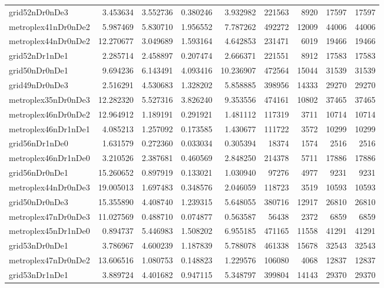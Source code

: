 \begin{longtable}{|l|r|r|r|r|r|r|r|r|}
grid52nDr0nDe3 & 3.453634 & 3.552736 & 0.380246 & 3.932982 & 221563 & 8920 & 17597 & 17597 \\
metroplex41nDr0nDe2 & 5.987469 & 5.830710 & 1.956552 & 7.787262 & 492272 & 12009 & 44006 & 44006 \\
metroplex44nDr0nDe2 & 12.270677 & 3.049689 & 1.593164 & 4.642853 & 231471 & 6019 & 19466 & 19466 \\
grid52nDr1nDe1 & 2.285714 & 2.458897 & 0.207474 & 2.666371 & 221551 & 8912 & 17583 & 17583 \\
grid50nDr0nDe1 & 9.694236 & 6.143491 & 4.093416 & 10.236907 & 472564 & 15044 & 31539 & 31539 \\
grid49nDr0nDe3 & 2.516291 & 4.530683 & 1.328202 & 5.858885 & 398956 & 14333 & 29270 & 29270 \\
metroplex35nDr0nDe3 & 12.282320 & 5.527316 & 3.826240 & 9.353556 & 474161 & 10802 & 37465 & 37465 \\
metroplex46nDr0nDe2 & 12.964912 & 1.189191 & 0.291921 & 1.481112 & 117319 & 3711 & 10714 & 10714 \\
metroplex46nDr1nDe1 & 4.085213 & 1.257092 & 0.173585 & 1.430677 & 111722 & 3572 & 10299 & 10299 \\
grid56nDr1nDe0 & 1.631579 & 0.272360 & 0.033034 & 0.305394 & 18374 & 1574 & 2516 & 2516 \\
metroplex46nDr1nDe0 & 3.210526 & 2.387681 & 0.460569 & 2.848250 & 214378 & 5711 & 17886 & 17886 \\
grid56nDr0nDe1 & 15.260652 & 0.897919 & 0.133021 & 1.030940 & 97276 & 4977 & 9231 & 9231 \\
metroplex44nDr0nDe3 & 19.005013 & 1.697483 & 0.348576 & 2.046059 & 118723 & 3519 & 10593 & 10593 \\
grid50nDr0nDe3 & 15.355890 & 4.408740 & 1.239315 & 5.648055 & 380716 & 12917 & 26810 & 26810 \\
metroplex47nDr0nDe3 & 11.027569 & 0.488710 & 0.074877 & 0.563587 & 56438 & 2372 & 6859 & 6859 \\
metroplex45nDr1nDe0 & 0.894737 & 5.446983 & 1.508202 & 6.955185 & 471165 & 11558 & 41291 & 41291 \\
grid53nDr0nDe1 & 3.786967 & 4.600239 & 1.187839 & 5.788078 & 461338 & 15678 & 32543 & 32543 \\
metroplex47nDr0nDe2 & 13.606516 & 1.080753 & 0.148823 & 1.229576 & 106080 & 4068 & 12837 & 12837 \\
grid53nDr1nDe1 & 3.889724 & 4.401682 & 0.947115 & 5.348797 & 399804 & 14143 & 29370 & 29370 \\

\end{longtable}
